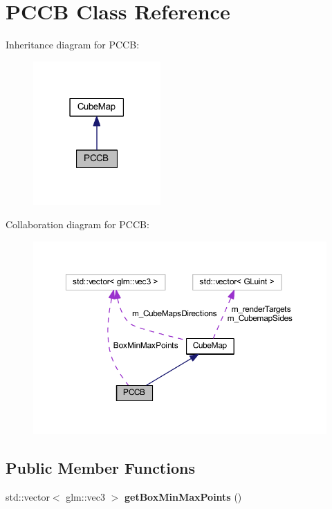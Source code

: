 \hypertarget{class_p_c_c_b}{}\section{P\+C\+CB Class Reference}
\label{class_p_c_c_b}


Inheritance diagram for P\+C\+CB\+:
\nopagebreak
\begin{figure}[H]
\begin{center}
\leavevmode
\includegraphics[width=138pt]{class_p_c_c_b__inherit__graph}
\end{center}
\end{figure}


Collaboration diagram for P\+C\+CB\+:
\nopagebreak
\begin{figure}[H]
\begin{center}
\leavevmode
\includegraphics[width=350pt]{class_p_c_c_b__coll__graph}
\end{center}
\end{figure}
\subsection*{Public Member Functions}
\begin{DoxyCompactItemize}
\item 
std\+::vector$<$ glm\+::vec3 $>$ {\bfseries get\+Box\+Min\+Max\+Points} ()\hypertarget{class_p_c_c_b_a9245619c1fe3b5bf2d9640a402c61090}{}\label{class_p_c_c_b_a9245619c1fe3b5bf2d9640a402c61090}

\end{DoxyCompactItemize}
